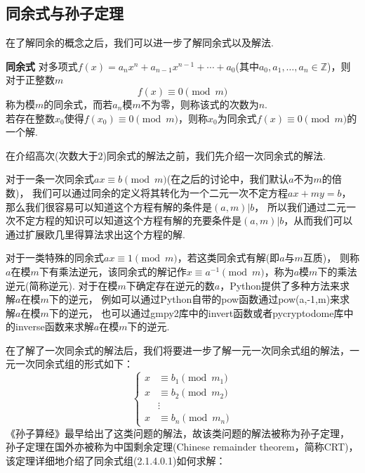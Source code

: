 \documentclass{book}
\numberwithin{equation}{subsubsection}
\begin{document}
\subsection{同余式与孙子定理}
在了解同余的概念之后，我们可以进一步了解同余式以及解法.\par
\begin{concept}{\textbf{同余式}}
对多项式$f(x)=a_nx^n+a_{n-1}x^{n-1}+\cdots+a_0$(其中$a_0,a_1,\ldots,a_n\in\mathbb{Z}$)，则对于正整数$m$
\begin{equation}
    f(x)\equiv 0\pmod{m}
    \nonumber
\end{equation}
称为模$m$的同余式，而若$a_n$模$m$不为零，则称该式的次数为$n$.\\
若存在整数$x_0$使得$f(x_0)\equiv 0\pmod{m}$，则称$x_0$为同余式$f(x)\equiv 0\pmod{m}$的一个解.\par
\end{concept}
在介绍高次(次数大于$2$)同余式的解法之前，我们先介绍一次同余式的解法.\par
对于一条一次同余式$ax\equiv b\pmod{m}$(在之后的讨论中，我们默认$a$不为$m$的倍数)，
我们可以通过同余的定义将其转化为一个二元一次不定方程$ax+my=b$，那么我们很容易可以知道这个方程有解的条件是$(a,m)|b$，
所以我们通过二元一次不定方程的知识可以知道这个方程有解的充要条件是$(a,m)|b$，从而我们可以通过扩展欧几里得算法求出这个方程的解.\par
对于一类特殊的同余式$ax\equiv 1\pmod{m}$，若这类同余式有解(即$a$与$m$互质)，
则称$a$在模$m$下有乘法逆元，该同余式的解记作$x\equiv a^{-1}\pmod{m}$，称为$a$模$m$下的乘法逆元(简称逆元).
对于在模$m$下确定存在逆元的数$a$，Python提供了多种方法来求解$a$在模$m$下的逆元，
例如可以通过Python自带的pow函数通过pow(a,-1,m)来求解$a$在模$m$下的逆元，
也可以通过gmpy2库中的invert函数或者pycryptodome库中的inverse函数来求解$a$在模$m$下的逆元.\par
在了解了一次同余式的解法后，我们将要进一步了解一元一次同余式组的解法，一元一次同余式组的形式如下：
\begin{equation}
    \begin{cases}
        x&\equiv b_1\pmod{m_1}\\
        x&\equiv b_2\pmod{m_2}\\
        &\vdots\\
        x&\equiv b_n\pmod{m_n}
    \end{cases}
\end{equation}
《孙子算经》最早给出了这类问题的解法，故该类问题的解法被称为孙子定理，
孙子定理在国外亦被称为中国剩余定理(Chinese remainder theorem，简称CRT)，
该定理详细地介绍了同余式组(2.1.4.0.1)如何求解：
\end{document}
